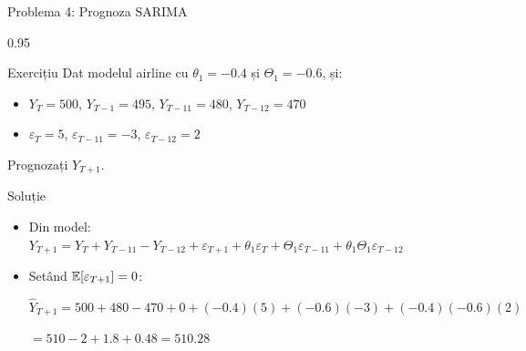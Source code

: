 \documentclass[9pt, aspectratio=169, t]{beamer}
\begin{document}
\begin{frame}{Problema 4: Prognoza SARIMA}
    \begin{cminipage}{0.95\textwidth}
    \begin{block}{Exercițiu}
        Dat modelul airline cu $\theta_1 = -0.4$ și $\Theta_1 = -0.6$, și:
        \begin{itemize}\setlength{\itemsep}{0pt}
            \item $Y_T = 500$, $Y_{T-1} = 495$, $Y_{T-11} = 480$, $Y_{T-12} = 470$
            \item $\varepsilon_T = 5$, $\varepsilon_{T-11} = -3$, $\varepsilon_{T-12} = 2$
        \end{itemize}
        Prognozați $Y_{T+1}$.
    \end{block}

    \pause
    \begin{exampleblock}{Soluție}
        \begin{itemize}\setlength{\itemsep}{0pt}
        \item Din model: $Y_{T+1} = Y_T + Y_{T-11} - Y_{T-12} + \varepsilon_{T+1} + \theta_1 \varepsilon_T + \Theta_1 \varepsilon_{T-11} + \theta_1 \Theta_1 \varepsilon_{T-12}$
        \item Setând $\mathbb{E}[\varepsilon_{T+1}] = 0$:

        $\hat{Y}_{T+1} = 500 + 480 - 470 + 0 + (-0.4)(5) + (-0.6)(-3) + (-0.4)(-0.6)(2)$

        $= 510 - 2 + 1.8 + 0.48 = \mathbf{510.28}$
        \end{itemize}
    \end{exampleblock}
    \end{cminipage}
\end{frame}
\end{document}

